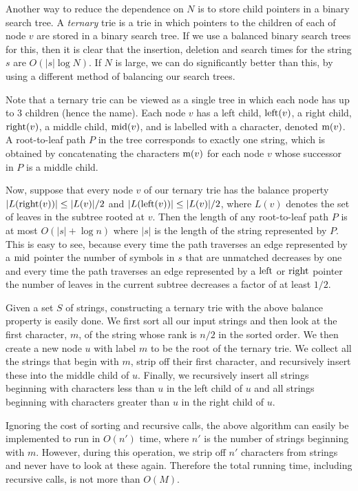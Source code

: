 Another way to reduce the dependence on $N$ is to store child pointers
in a binary search tree.  A \emph{ternary} trie is a trie in which
pointers to the children of each of node $v$ are stored in a binary
search tree.  If we use a balanced binary search trees for this, then it
is clear that the insertion, deletion and search times for the string
$s$ are $O(|s|\log N)$.  If $N$ is large, we can do significantly
better than this, by using a different method of balancing our search
trees.

Note that a ternary trie can be viewed as a single tree in which each
node has up to 3 children (hence the name).  Each node $v$ has a left
child, $\mathrm{left}(v)$, a right child, $\mathrm{right}(v)$, a middle child, $\mathrm{mid}(v)$,
and is labelled with a character, denoted $\mathrm{m}(v)$.  A root-to-leaf path
$P$ in the tree corresponds to exactly one string, which is obtained by
concatenating the characters $\mathrm{m}(v)$ for each node $v$ whose successor
in $P$ is a middle child.

Now, suppose that every node $v$ of our ternary trie has the balance
property $|L(\mathrm{right}(v))|\le |L(v)|/2$ and $|L(\mathrm{left}(v))|\le |L(v)|/2$,
where $L(v)$ denotes the set of leaves in the subtree rooted at $v$.
Then the length of any root-to-leaf path $P$ is at most $O(|s|+\log
n)$ where $|s|$ is the length of the string represented by $P$.  This
is easy to see, because every time the path traverses an edge
represented by a $\mathrm{mid}$ pointer the number of symbols in $s$ that are
unmatched decreases by one and every time the path traverses an edge
represented by a $\mathrm{left}$ or $\mathrm{right}$ pointer the number of leaves in the
current subtree decreases a factor of at least $1/2$.

Given a set $S$ of strings, constructing a ternary trie with the above
balance property is easily done.  We first sort all our input strings
and then look at the first character, $m$, of the string whose rank is
$n/2$ in the sorted order.  We then create a new node $u$ with label
$m$ to be the root of the ternary trie.  We collect all the strings
that begin with $m$, strip off their first character, and recursively
insert these into the middle child of $u$.  Finally, we recursively
insert all strings beginning with characters less than $u$ in the left
child of $u$ and all strings beginning with characters greater than
$u$ in the right child of $u$.

Ignoring the cost of sorting and recursive calls, the above algorithm
can easily be implemented to run in $O(n')$ time, where $n'$ is the
number of strings beginning with $m$.  However, during this operation,
we strip off $n'$ characters from strings and never have to look at
these again.  Therefore the total running time, including recursive
calls, is not more than $O(M)$.

